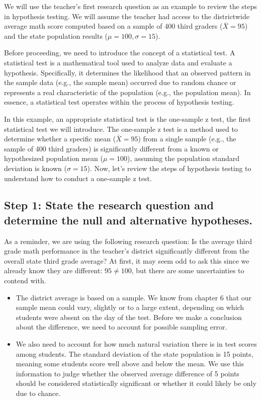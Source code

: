 \documentclass[
  letterpaper,
  DIV=11,
  numbers=noendperiod]{scrreprt}
\begin{document}
We will use the teacher's first research question as an example to
review the steps in hypothesis testing. We will assume the teacher had
access to the districtwide average math score computed based on a sample
of 400 third graders (\(\bar{X} = 95\)) and the state population results
(\(\mu = 100, \sigma = 15\)).

Before proceeding, we need to introduce the concept of a statistical
test. A statistical test is a mathematical tool used to analyze data and
evaluate a hypothesis. Specifically, it determines the likelihood that
an observed pattern in the sample data (e.g., the sample mean) occurred
due to random chance or represents a real characteristic of the
population (e.g., the population mean). In essence, a statistical test
operates within the process of hypothesis testing.

In this example, an appropriate statistical test is the one-sample z
test, the first statistical test we will introduce. The one-sample z
test is a method used to determine whether a specific mean
(\(\bar{X} = 95\)) from a single sample (e.g., the sample of 400 third
graders) is significantly different from a known or hypothesized
population mean (\(\mu = 100\)), assuming the population standard
deviation is known (\(\sigma = 15\)). Now, let's review the steps of
hypothesis testing to understand how to conduct a one-sample z test.

\subsection*{Step 1: State the research question and determine the null
and alternative
hypotheses.}\label{step-1-state-the-research-question-and-determine-the-null-and-alternative-hypotheses.}

As a reminder, we are using the following research question: Is the
average third grade math performance in the teacher's district
significantly different from the overall state third grade average? At
first, it may seem odd to ask this since we already know they are
different: \(95 \ne 100\), but there are some uncertainties to contend
with.

\begin{itemize}
\item
  The district average is based on a sample. We know from chapter 6 that
  our sample mean could vary, slightly or to a large extent, depending
  on which students were absent on the day of the test. Before we make a
  conclusion about the difference, we need to account for possible
  sampling error.
\item
  We also need to account for how much natural variation there is in
  test scores among students. The standard deviation of the state
  population is 15 points, meaning some students score well above and
  below the mean. We use this information to judge whether the observed
  average difference of 5 points should be considered statistically
  significant or whether it could likely be only due to chance.
\end{itemize}
\end{document}
